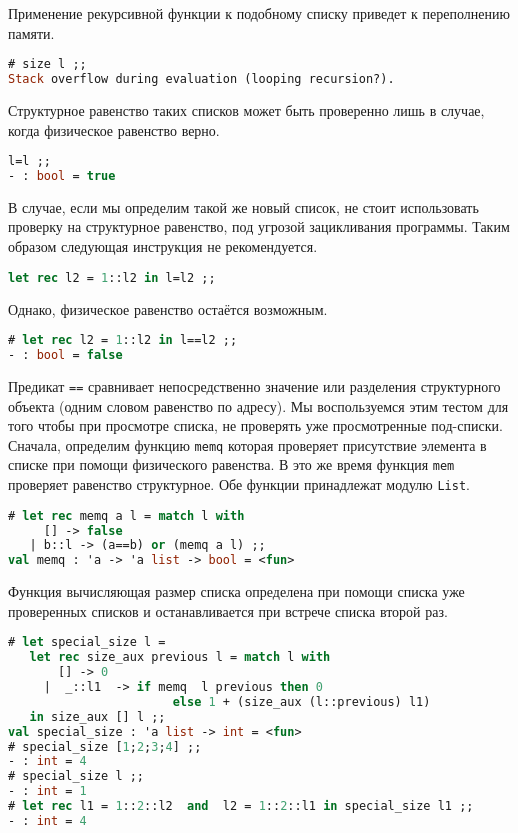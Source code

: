 Применение рекурсивной функции к подобному списку приведет к переполнению
памяти.

\begin{lstlisting}[language=OCaml]
# size l ;;
Stack overflow during evaluation (looping recursion?).
\end{lstlisting}

Структурное равенство таких списков может быть проверенно лишь в случае, когда
физическое равенство верно.

\begin{lstlisting}[language=OCaml]
l=l ;;
- : bool = true
\end{lstlisting}

В случае, если мы определим такой же новый список, не стоит использовать
проверку на структурное равенство, под угрозой зацикливания программы. Таким
образом следующая инструкция не рекомендуется.

\begin{lstlisting}[language=OCaml]
let rec l2 = 1::l2 in l=l2 ;;
\end{lstlisting}

Однако, физическое равенство остаётся возможным.

\begin{lstlisting}[language=OCaml]
# let rec l2 = 1::l2 in l==l2 ;;
- : bool = false
\end{lstlisting}

Предикат \texttt{==} сравнивает непосредственно значение или разделения
структурного объекта (одним словом равенство по адресу). Мы воспользуемся этим
тестом для того чтобы при просмотре списка, не проверять уже просмотренные
под-списки. Сначала, определим функцию \texttt{memq} которая проверяет
присутствие элемента в списке при помощи физического равенства. В это же время
функция \texttt{mem} проверяет равенство структурное. Обе функции принадлежат
модулю \texttt{List}.

\begin{lstlisting}[language=OCaml]
# let rec memq a l = match l with
     [] -> false
   | b::l -> (a==b) or (memq a l) ;;
val memq : 'a -> 'a list -> bool = <fun>
\end{lstlisting}

Функция вычисляющая размер списка определена при помощи списка уже проверенных
списков и останавливается при встрече списка второй раз.

\begin{lstlisting}[language=OCaml]
# let special_size l =
   let rec size_aux previous l = match l with
       [] -> 0
     |  _::l1  -> if memq  l previous then 0
                       else 1 + (size_aux (l::previous) l1)
   in size_aux [] l ;;
val special_size : 'a list -> int = <fun>
# special_size [1;2;3;4] ;;
- : int = 4
# special_size l ;;
- : int = 1
# let rec l1 = 1::2::l2  and  l2 = 1::2::l1 in special_size l1 ;;
- : int = 4
\end{lstlisting}



